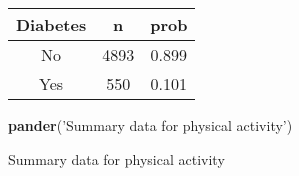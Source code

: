 \documentclass[]{book}
\newenvironment{Shaded}{\begin{snugshade}}{\end{snugshade}}
\newcommand{\KeywordTok}[1]{\textcolor[rgb]{0.13,0.29,0.53}{\textbf{#1}}}
\newcommand{\DataTypeTok}[1]{\textcolor[rgb]{0.13,0.29,0.53}{#1}}
\newcommand{\StringTok}[1]{\textcolor[rgb]{0.31,0.60,0.02}{#1}}
\newcommand{\OperatorTok}[1]{\textcolor[rgb]{0.81,0.36,0.00}{\textbf{#1}}}
\newcommand{\NormalTok}[1]{#1}
\theoremstyle{definition}
\theoremstyle{definition}
\theoremstyle{definition}
\theoremstyle{remark}
\begin{document}
\begin{longtable}[]{@{}ccc@{}}
\toprule
\begin{minipage}[b]{0.14\columnwidth}\centering\strut
Diabetes\strut
\end{minipage} & \begin{minipage}[b]{0.09\columnwidth}\centering\strut
n\strut
\end{minipage} & \begin{minipage}[b]{0.09\columnwidth}\centering\strut
prob\strut
\end{minipage}\tabularnewline
\midrule
\endhead
\begin{minipage}[t]{0.14\columnwidth}\centering\strut
No\strut
\end{minipage} & \begin{minipage}[t]{0.09\columnwidth}\centering\strut
4893\strut
\end{minipage} & \begin{minipage}[t]{0.09\columnwidth}\centering\strut
0.899\strut
\end{minipage}\tabularnewline
\begin{minipage}[t]{0.14\columnwidth}\centering\strut
Yes\strut
\end{minipage} & \begin{minipage}[t]{0.09\columnwidth}\centering\strut
550\strut
\end{minipage} & \begin{minipage}[t]{0.09\columnwidth}\centering\strut
0.101\strut
\end{minipage}\tabularnewline
\bottomrule
\end{longtable}

\begin{Shaded}
\begin{Highlighting}[]
\KeywordTok{pander}\NormalTok{(}\StringTok{'Summary data for physical activity'}\NormalTok{)}
\end{Highlighting}
\end{Shaded}

Summary data for physical activity

\begin{Shaded}
\end{Shaded}
\end{document}
